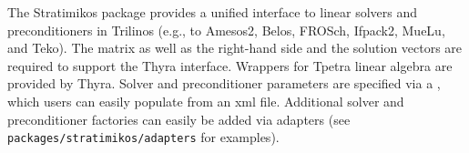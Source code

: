 The Stratimikos package provides a unified interface to linear solvers and preconditioners in Trilinos (e.g., to Amesos2, Belos, FROSch, Ifpack2, MueLu, and Teko).
The matrix as well as the right-hand side and the solution vectors are required to support the Thyra interface.
Wrappers for Tpetra linear algebra are provided by Thyra.
Solver and preconditioner parameters are specified via a ,
which users can easily populate from an xml file.
Additional solver and preconditioner factories can easily be added via adapters (see \texttt{packages/stratimikos/adapters} for examples).
